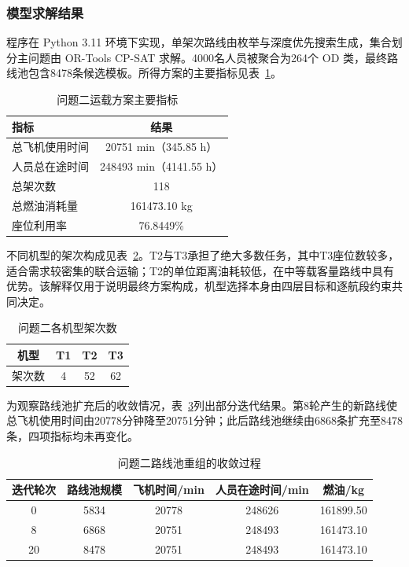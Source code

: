 \documentclass[UTF-8,a4paper,zihao=-4]{ctexart}
\begin{document}
\subsubsection{模型求解结果}

程序在 Python 3.11 环境下实现，单架次路线由枚举与深度优先搜索生成，集合划分主问题由 OR-Tools CP-SAT 求解。4000名人员被聚合为264个 OD 类，最终路线池包含8478条候选模板。所得方案的主要指标见表~\ref{tab:q2-result}。

\begin{table}[htbp]
\centering
\caption{问题二运载方案主要指标}
\label{tab:q2-result}
\begin{tabular}{lc}
\toprule
指标 & 结果 \\
\midrule
总飞机使用时间 & 20751 min（345.85 h） \\
人员总在途时间 & 248493 min（4141.55 h） \\
总架次数 & 118 \\
总燃油消耗量 & 161473.10 kg \\
座位利用率 & 76.8449\% \\
\bottomrule
\end{tabular}
\end{table}

不同机型的架次构成见表~\ref{tab:q2-type}。T2与T3承担了绝大多数任务，其中T3座位数较多，适合需求较密集的联合运输；T2的单位距离油耗较低，在中等载客量路线中具有优势。该解释仅用于说明最终方案构成，机型选择本身由四层目标和逐航段约束共同决定。

\begin{table}[htbp]
\centering
\caption{问题二各机型架次数}
\label{tab:q2-type}
\begin{tabular}{cccc}
\toprule
机型 & T1 & T2 & T3 \\
\midrule
架次数 & 4 & 52 & 62 \\
\bottomrule
\end{tabular}
\end{table}

为观察路线池扩充后的收敛情况，表~\ref{tab:q2-convergence}列出部分迭代结果。第8轮产生的新路线使总飞机使用时间由20778分钟降至20751分钟；此后路线池继续由6868条扩充至8478条，四项指标均未再变化。

\begin{table}[htbp]
\centering
\caption{问题二路线池重组的收敛过程}
\label{tab:q2-convergence}
\begin{tabular}{ccccc}
\toprule
迭代轮次 & 路线池规模 & 飞机时间/min & 人员在途时间/min & 燃油/kg \\
\midrule
0  & 5834 & 20778 & 248626 & 161899.50 \\
8  & 6868 & 20751 & 248493 & 161473.10 \\
20 & 8478 & 20751 & 248493 & 161473.10 \\
\bottomrule
\end{tabular}
\end{table}
\end{document}
